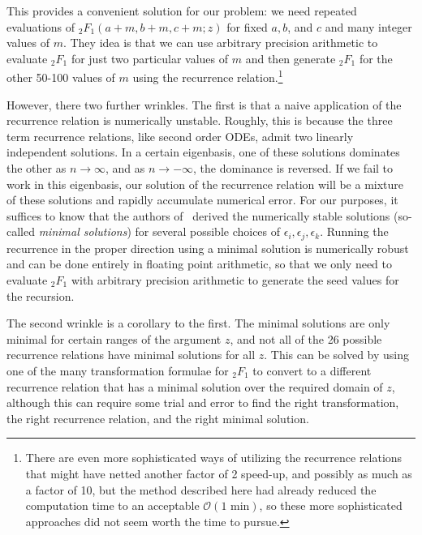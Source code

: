 This provides a convenient solution for our problem: we need repeated
evaluations of ${_2F_1}(a+m, b+m, c+m; z)$
for fixed $a,b$, and $c$ and many integer values of $m$.
They idea is that we can use arbitrary precision arithmetic to evaluate
${_2F_1}$ for just two particular values of $m$ and then generate
${_2F_1}$ for the other 50-100 values of $m$ using the recurrence
relation.\footnote{
There are even more sophisticated ways of utilizing the recurrence
relations that might have netted another factor of 2 speed-up, and
possibly as much as a factor of 10, but the method described here had
already reduced the computation time to an acceptable
$\mathcal{O}(\text{1 min})$, so these more sophisticated approaches did
not seem worth the time to pursue.
}

However, there two further wrinkles.
The first is that
a naive application of the recurrence relation is numerically unstable.
Roughly, this is because the three term recurrence relations,
like second order ODEs, admit two linearly independent solutions.
In a certain eigenbasis, one of these solutions dominates the other
as $n\rightarrow\infty$, and as $n\rightarrow-\infty$,
the dominance is reversed.
If we fail to work in this eigenbasis, our solution of the recurrence relation
will be a mixture of these solutions and rapidly accumulate numerical error.
For our purposes, it suffices to know that the authors of~\cite{Gil2007}
derived the numerically stable solutions (so-called \textit{minimal solutions})
for several possible choices of $\epsilon_i, \epsilon_j, \epsilon_k$.
Running the recurrence in the proper direction using a minimal solution
is numerically robust and can be done entirely in floating point arithmetic, 
so that we only need to evaluate ${_2F_1}$ with arbitrary precision arithmetic
to generate the seed values for the recursion.

The second wrinkle is a corollary to the first.
The minimal solutions are only minimal for certain ranges of the argument $z$,
and not all of the 26 possible recurrence relations
have minimal solutions for all $z$.
This can be solved by using one of the many transformation formulae for
${_2F_1}$ to convert to a different recurrence relation that has
a minimal solution over the required domain of $z$, although
this can require some trial and error to find the right transformation,
the right recurrence relation, and the right minimal solution.

